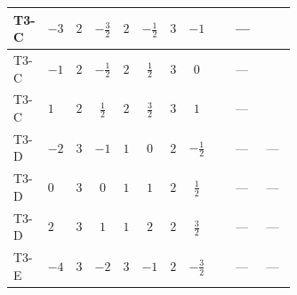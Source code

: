 \documentclass[8pt]{article}
\begin{document}
\begin{landscape}
\begin{longtable}{@{}llcccccc >{\raggedright\arraybackslash}p{0.21\linewidth} >{\raggedright\arraybackslash}p{0.21\linewidth} >{\raggedright\arraybackslash}p{0.21\linewidth}@{}}
\midrule
T3-C & $-3$ & $2$ & $-\frac{3}{2}$ & $2$ & $-\frac{1}{2}$ & $3$ & $-1$ & \scriptsize\adjustbox{max width=\linewidth}{$\begin{gathered} +4 {\lambda_{HS_1}^{(1)}} {\lambda_{HS_2}^{(1)}}\end{gathered}$} & --- & \scriptsize\adjustbox{max width=\linewidth}{$\begin{gathered} +\frac{9 {g_2}^4}{4}\end{gathered}$} \\
\midrule
T3-C & $-1$ & $2$ & $-\frac{1}{2}$ & $2$ & $\frac{1}{2}$ & $3$ & $0$ & \scriptsize\adjustbox{max width=\linewidth}{$\begin{gathered} +4 {\lambda_{HS_1}^{(1)}} {\lambda_{HS_2}^{(1)}}\end{gathered}$} & --- & \scriptsize\adjustbox{max width=\linewidth}{$\begin{gathered} +\frac{9 {g_2}^4}{4}\end{gathered}$} \\
\midrule
T3-C & $1$ & $2$ & $\frac{1}{2}$ & $2$ & $\frac{3}{2}$ & $3$ & $1$ & \scriptsize\adjustbox{max width=\linewidth}{$\begin{gathered} +4 {\lambda_{HS_1}^{(1)}} {\lambda_{HS_2}^{(1)}}\end{gathered}$} & --- & \scriptsize\adjustbox{max width=\linewidth}{$\begin{gathered} +\frac{9 {g_2}^4}{4}\end{gathered}$} \\
\midrule
T3-D & $-2$ & $3$ & $-1$ & $1$ & $0$ & $2$ & $-\frac{1}{2}$ & \scriptsize\adjustbox{max width=\linewidth}{$\begin{gathered} +4 {\lambda_{HS_1}^{(1)}} {\lambda_{HS_2}^{(1)}}\end{gathered}$} & --- & --- \\
\midrule
T3-D & $0$ & $3$ & $0$ & $1$ & $1$ & $2$ & $\frac{1}{2}$ & \scriptsize\adjustbox{max width=\linewidth}{$\begin{gathered} +4 {\lambda_{HS_1}^{(1)}} {\lambda_{HS_2}^{(1)}}\end{gathered}$} & --- & --- \\
\midrule
T3-D & $2$ & $3$ & $1$ & $1$ & $2$ & $2$ & $\frac{3}{2}$ & \scriptsize\adjustbox{max width=\linewidth}{$\begin{gathered} +4 {\lambda_{HS_1}^{(1)}} {\lambda_{HS_2}^{(1)}}\end{gathered}$} & --- & --- \\
\midrule
T3-E & $-4$ & $3$ & $-2$ & $3$ & $-1$ & $2$ & $-\frac{3}{2}$ & \scriptsize\adjustbox{max width=\linewidth}{$\begin{gathered} +4 {\lambda_{HS_1}^{(1)}} {\lambda_{HS_2}^{(1)}}\end{gathered}$} & --- & --- \\

\end{longtable}
\end{landscape}
\end{document}
